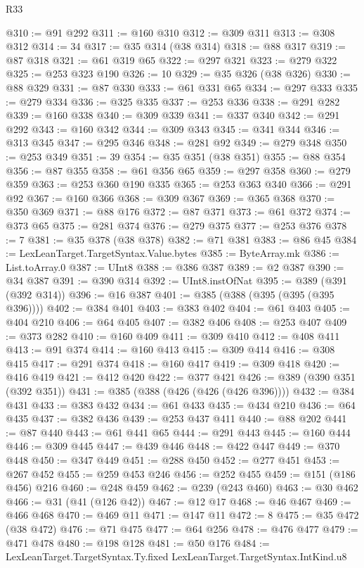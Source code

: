 \begin{lexlean}{R33}
\begin{coremodule}
@310 := @91 @292
@311 := @160 @310
@312 := @309 @311
@313 := @308 @312
@314 := 34
@317 := @35 @314 (@38 @314)
@318 := @88 @317
@319 := @87 @318
@321 := @61 @319 @65
@322 := @297 @321
@323 := @279 @322
@325 := @253 @323 @190
@326 := 10
@329 := @35 @326 (@38 @326)
@330 := @88 @329
@331 := @87 @330
@333 := @61 @331 @65
@334 := @297 @333
@335 := @279 @334
@336 := @325 @335
@337 := @253 @336
@338 := @291 @282
@339 := @160 @338
@340 := @309 @339
@341 := @337 @340
@342 := @291 @292
@343 := @160 @342
@344 := @309 @343
@345 := @341 @344
@346 := @313 @345
@347 := @295 @346
@348 := @281 @92
@349 := @279 @348
@350 := @253 @349
@351 := 39
@354 := @35 @351 (@38 @351)
@355 := @88 @354
@356 := @87 @355
@358 := @61 @356 @65
@359 := @297 @358
@360 := @279 @359
@363 := @253 @360 @190 @335
@365 := @253 @363 @340
@366 := @291 @92
@367 := @160 @366
@368 := @309 @367
@369 := @365 @368
@370 := @350 @369
@371 := @88 @176
@372 := @87 @371
@373 := @61 @372
@374 := @373 @65
@375 := @281 @374
@376 := @279 @375
@377 := @253 @376
@378 := 7
@381 := @35 @378 (@38 @378)
@382 := @71 @381
@383 := @86 @45
@384 := LexLeanTarget.TargetSyntax.Value.bytes
@385 := ByteArray.mk
@386 := List.toArray.{0}
@387 := UInt8
@388 := @386 @387
@389 := @2 @387
@390 := @34 @387
@391 := @390 @314
@392 := UInt8.instOfNat
@395 := @389 (@391 (@392 @314))
@396 := @16 @387
@401 := @385 (@388 (@395 (@395 (@395 @396))))
@402 := @384 @401
@403 := @383 @402
@404 := @61 @403
@405 := @404 @210
@406 := @64 @405
@407 := @382 @406
@408 := @253 @407
@409 := @373 @282
@410 := @160 @409
@411 := @309 @410
@412 := @408 @411
@413 := @91 @374
@414 := @160 @413
@415 := @309 @414
@416 := @308 @415
@417 := @291 @374
@418 := @160 @417
@419 := @309 @418
@420 := @416 @419
@421 := @412 @420
@422 := @377 @421
@426 := @389 (@390 @351 (@392 @351))
@431 := @385 (@388 (@426 (@426 (@426 @396))))
@432 := @384 @431
@433 := @383 @432
@434 := @61 @433
@435 := @434 @210
@436 := @64 @435
@437 := @382 @436
@439 := @253 @437 @411
@440 := @88 @202
@441 := @87 @440
@443 := @61 @441 @65
@444 := @291 @443
@445 := @160 @444
@446 := @309 @445
@447 := @439 @446
@448 := @422 @447
@449 := @370 @448
@450 := @347 @449
@451 := @288 @450
@452 := @277 @451
@453 := @267 @452
@455 := @259 @453 @246
@456 := @252 @455
@459 := @151 (@186 @456) @216
@460 := @248 @459
@462 := @239 (@243 @460)
@463 := @30 @462
@466 := @31 (@41 (@126 @42))
@467 := @12 @17
@468 := @46 @467
@469 := @466 @468
@470 := @469 @11
@471 := @147 @11
@472 := 8
@475 := @35 @472 (@38 @472)
@476 := @71 @475
@477 := @64 @256
@478 := @476 @477
@479 := @471 @478
@480 := @198 @128
@481 := @50 @176
@484 := LexLeanTarget.TargetSyntax.Ty.fixed LexLeanTarget.TargetSyntax.IntKind.u8

\end{coremodule}
\end{lexlean}
